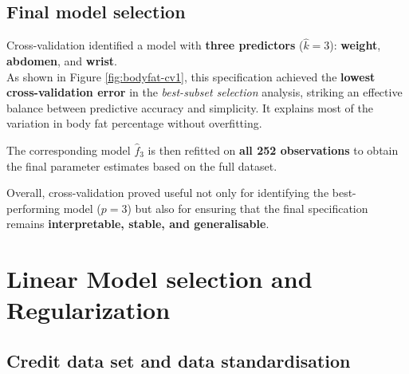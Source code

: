 \documentclass[
  letterpaper,
  DIV=11,
  numbers=noendperiod]{scrartcl}
\begin{document}
\subsection{Final model selection}\label{final-model-selection}

Cross-validation identified a model with \textbf{three predictors}
(\(\hat{k} = 3\)): \textbf{weight}, \textbf{abdomen}, and
\textbf{wrist}.\\
As shown in Figure \ref{fig:bodyfat-cv1}, this specification achieved
the \textbf{lowest cross-validation error} in the \emph{best-subset
selection} analysis, striking an effective balance between predictive
accuracy and simplicity. It explains most of the variation in body fat
percentage without overfitting.

The corresponding model \(\hat{f}_3\) is then refitted on \textbf{all
252 observations} to obtain the final parameter estimates based on the
full dataset.

Overall, cross-validation proved useful not only for identifying the
best-performing model (\(p = 3\)) but also for ensuring that the final
specification remains \textbf{interpretable, stable, and generalisable}.

\section{Linear Model selection and
Regularization}\label{linear-model-selection-and-regularization}

\subsection{Credit data set and data
standardisation}\label{credit-data-set-and-data-standardisation}
\end{document}
